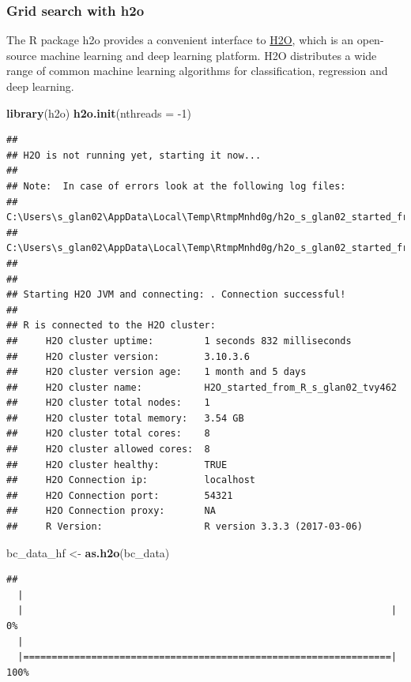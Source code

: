 \documentclass[]{article}
\newenvironment{Shaded}{\begin{snugshade}}{\end{snugshade}}
\newcommand{\KeywordTok}[1]{\textcolor[rgb]{0.13,0.29,0.53}{\textbf{{#1}}}}
\newcommand{\DataTypeTok}[1]{\textcolor[rgb]{0.13,0.29,0.53}{{#1}}}
\newcommand{\DecValTok}[1]{\textcolor[rgb]{0.00,0.00,0.81}{{#1}}}
\newcommand{\StringTok}[1]{\textcolor[rgb]{0.31,0.60,0.02}{{#1}}}
\newcommand{\NormalTok}[1]{{#1}}
\begin{document}
\subsubsection{Grid search with h2o}\label{grid-search-with-h2o}

The R package h2o provides a convenient interface to
\href{http://www.h2o.ai/h2o/}{H2O}, which is an open-source machine
learning and deep learning platform. H2O distributes a wide range of
common machine learning algorithms for classification, regression and
deep learning.

\begin{Shaded}
\begin{Highlighting}[]
\KeywordTok{library}\NormalTok{(h2o)}
\KeywordTok{h2o.init}\NormalTok{(}\DataTypeTok{nthreads =} \NormalTok{-}\DecValTok{1}\NormalTok{)}
\end{Highlighting}
\end{Shaded}

\begin{verbatim}
## 
## H2O is not running yet, starting it now...
## 
## Note:  In case of errors look at the following log files:
##     C:\Users\s_glan02\AppData\Local\Temp\RtmpMnhd0g/h2o_s_glan02_started_from_r.out
##     C:\Users\s_glan02\AppData\Local\Temp\RtmpMnhd0g/h2o_s_glan02_started_from_r.err
## 
## 
## Starting H2O JVM and connecting: . Connection successful!
## 
## R is connected to the H2O cluster: 
##     H2O cluster uptime:         1 seconds 832 milliseconds 
##     H2O cluster version:        3.10.3.6 
##     H2O cluster version age:    1 month and 5 days  
##     H2O cluster name:           H2O_started_from_R_s_glan02_tvy462 
##     H2O cluster total nodes:    1 
##     H2O cluster total memory:   3.54 GB 
##     H2O cluster total cores:    8 
##     H2O cluster allowed cores:  8 
##     H2O cluster healthy:        TRUE 
##     H2O Connection ip:          localhost 
##     H2O Connection port:        54321 
##     H2O Connection proxy:       NA 
##     R Version:                  R version 3.3.3 (2017-03-06)
\end{verbatim}

\begin{Shaded}
\begin{Highlighting}[]
\NormalTok{bc_data_hf <-}\StringTok{ }\KeywordTok{as.h2o}\NormalTok{(bc_data)}
\end{Highlighting}
\end{Shaded}

\begin{verbatim}
## 
  |                                                                       
  |                                                                 |   0%
  |                                                                       
  |=================================================================| 100%
\end{verbatim}
\end{document}
